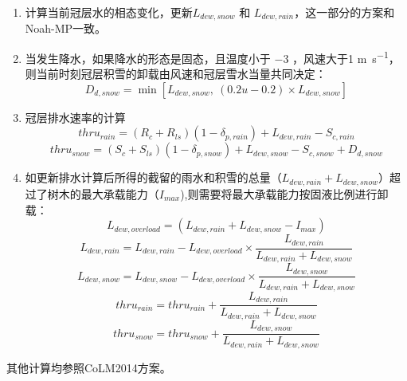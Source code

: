 \begin{enumerate}
\item 计算当前冠层水的相态变化，更新$L_{dew,snow}$ 和 $L_{dew,rain}$，这一部分的方案和Noah-MP一致。

\item 当发生降水，如果降水的形态是固态，且温度小于 $-3$ \textcelsius ，风速大于1 \unit{m.s^{-1}}，则当前时刻冠层积雪的卸载由风速和冠层雪水当量共同决定：
\begin{equation}
D_{d,snow} = \min\left[L_{dew,snow},\ (0.2u-0.2) \times L_{dew,snow}\right]
\end{equation}

\item 冠层排水速率的计算
\begin{equation}
thru_{rain}=\left(R_{c}+R_{ls}\right)\left(1-\delta_{p,rain}\right)+L_{dew,rain}-S_{c,rain}
\end{equation}
\begin{equation}
thru_{snow}=\left(S_{c}+S_{ls}\right)\left(1-\delta_{p,snow}\right)+L_{dew,snow}-S_{c,snow}+D_{d,snow}
\end{equation}

\item 如更新排水计算后所得的截留的雨水和积雪的总量（$L_{dew,rain}+L_{dew,snow}$）超过了树木的最大承载能力（$I_{max}$),则需要将最大承载能力按固液比例进行卸载：
\begin{equation}
L_{dew,overload}=(L_{dew,rain}+L_{dew,snow}-I_{max})
\end{equation}
\begin{equation}
L_{dew,rain}=L_{dew,rain} - L_{dew,overload} \times \frac{L_{dew,rain}}{L_{dew,rain}+L_{dew,snow}}
\end{equation}
\begin{equation}
L_{dew,snow}=L_{dew,snow} - L_{dew,overload} \times   \frac{L_{dew,snow}}{L_{dew,rain}+L_{dew,snow}}
\end{equation}
\begin{equation}
thru_{rain}=thru_{rain} + \frac{L_{dew,rain}}{L_{dew,rain}+L_{dew,snow}}
\end{equation}
\begin{equation}
thru_{snow}=thru_{snow} + \frac{L_{dew,snow}}{L_{dew,rain}+L_{dew,snow}}
\end{equation}
\end{enumerate}
其他计算均参照CoLM2014方案。


